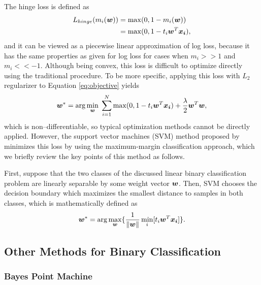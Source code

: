The hinge loss is defined as
\[ \begin{split}
L_{hinge}(m_i(\boldsymbol{w})) &= \max(0, 1 - m_i(\boldsymbol{w})) \\
&= \max(0, 1 - t_i \boldsymbol{w}^T \boldsymbol{x_i}),
\end{split} \] 
and it can be viewed as a piecewise linear approximation of log loss, because it has the same properties as given for log loss for cases when $m_i >> 1$ and $m_i << -1$. Although being convex, this loss is difficult to optimize directly using the traditional procedure. To be more specific, applying this loss with $L_2$ regularizer to Equation \ref{eq:objective} yields 
\begin{equation}
\label{eq:svmobj}
\boldsymbol{w}^* = \arg\min_{\boldsymbol{w}} \; \sum_{i=1}^{N} \max(0,1 - t_i\boldsymbol{w}^T\boldsymbol{x_i})  + \frac{\lambda}{2} \boldsymbol{w}^T\boldsymbol{w},
\end{equation}
which is non--differentiable, so typical optimization methods cannot be directly applied. However, the support vector machines (SVM) method proposed by \cite{Vapnik} minimizes this loss by using the maximum-margin classification approach, which we briefly review the key points of this method as follows.

First, suppose that the two classes of the discussed linear binary classification problem are linearly separable by some weight vector $\boldsymbol{w}$. Then, SVM chooses the decision boundary which maximizes the smallest distance to samples in both classes, which is mathematically defined as
$$ \boldsymbol{w}^* = \arg \max_{\boldsymbol{w}} \{ \frac{1}{\|\boldsymbol{w}\|} \min_i [t_i\boldsymbol{w}^T \boldsymbol{x_i}] \}. $$

\subsection{Other Methods for Binary Classification}
\label{sec:bgr.others}


\subsubsection{Bayes Point Machine}

